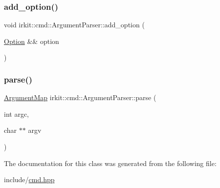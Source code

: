 \mbox{\label{classirkit_1_1cmd_1_1ArgumentParser_a13322fbd3458490faf4537442b308605}} 
\subsubsection{\texorpdfstring{add\+\_\+option()}{add\_option()}}
{\footnotesize\ttfamily void irkit\+::cmd\+::\+Argument\+Parser\+::add\+\_\+option (\begin{DoxyParamCaption}\item[{\mbox{\hyperlink{classirkit_1_1cmd_1_1Option}{Option}} \&\&}]{option }\end{DoxyParamCaption})\hspace{0.3cm}{\ttfamily [inline]}}

\mbox{\label{classirkit_1_1cmd_1_1ArgumentParser_a932ef050329d4f1f1da4812eb3a8b721}} 
\subsubsection{\texorpdfstring{parse()}{parse()}}
{\footnotesize\ttfamily \mbox{\hyperlink{classirkit_1_1cmd_1_1ArgumentMap}{Argument\+Map}} irkit\+::cmd\+::\+Argument\+Parser\+::parse (\begin{DoxyParamCaption}\item[{int}]{argc,  }\item[{char $\ast$$\ast$}]{argv }\end{DoxyParamCaption})\hspace{0.3cm}{\ttfamily [inline]}}



The documentation for this class was generated from the following file\+:\begin{DoxyCompactItemize}
\item 
include/\mbox{\hyperlink{cmd_8hpp}{cmd.\+hpp}}\end{DoxyCompactItemize}
